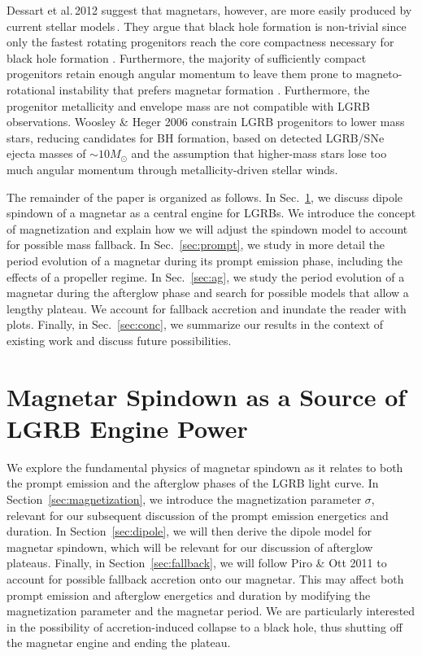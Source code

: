 \documentclass{article}
\begin{document}
Dessart et al.\,2012 suggest that magnetars, however, are more easily produced by current stellar models\,\cite{Dessart:2012ap}. They argue that black hole formation is non-trivial since only the fastest rotating progenitors reach the core compactness necessary for black hole formation \cite{Dessart:2012ap}. Furthermore, the majority of sufficiently compact progenitors retain enough angular momentum to leave them prone to magneto-rotational instability that prefers magnetar formation \cite{Dessart:2012ap}. Furthermore, the progenitor metallicity and envelope mass are not compatible with LGRB observations. Woosley \& Heger 2006 \cite{Woosley:2005gy} constrain LGRB progenitors to lower mass stars, reducing candidates for BH formation, based on detected LGRB/SNe ejecta masses of $\sim 10 M_{\odot}$ and the assumption that higher-mass stars lose too much angular momentum through metallicity-driven stellar winds. \newline \newline

The remainder of the paper is organized as follows. In Sec.~\ref{sec:1}, we discuss dipole spindown of a magnetar as a central engine for LGRBs. We introduce the concept of magnetization and explain how we will adjust the spindown model to account for possible mass fallback. In Sec.~\ref{sec:prompt}, we study in more detail the period evolution of a magnetar during its prompt emission phase, including the effects of a propeller regime. In Sec.~\ref{sec:ag}, we study the period evolution of a magnetar during the afterglow phase and search for possible models that allow a lengthy plateau. We account for fallback accretion and inundate the reader with plots. Finally, in Sec.~\ref{sec:conc}, we summarize our results in the context of existing work and discuss future possibilities. 

\section{Magnetar Spindown as a Source of LGRB Engine Power} \label{sec:1}
We explore the fundamental physics of magnetar spindown as it relates to both the prompt emission and the afterglow phases of the LGRB light curve. In Section~\ref{sec:magnetization}, we introduce the magnetization parameter $\sigma$, relevant for our subsequent discussion of the prompt emission energetics and duration. In Section~\ref{sec:dipole}, we will then derive the dipole model for magnetar spindown, which will be relevant for our discussion of afterglow plateaus. Finally, in Section~\ref{sec:fallback}, we will follow Piro \& Ott 2011 \cite{Piro:2011ed} to account for possible fallback accretion onto our magnetar. This may affect both prompt emission and afterglow energetics and duration by modifying the magnetization parameter and the magnetar period.  We are particularly interested in the possibility of accretion-induced collapse to a black hole, thus shutting off the magnetar engine and ending the plateau.
\end{document}
